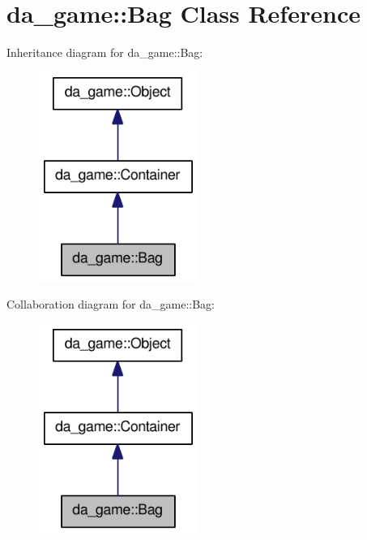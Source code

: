 \hypertarget{classda__game_1_1Bag}{
\section{da\_\-game::Bag Class Reference}
\label{classda__game_1_1Bag}
}
Inheritance diagram for da\_\-game::Bag:\nopagebreak
\begin{figure}[H]
\begin{center}
\leavevmode
\includegraphics[width=146pt]{classda__game_1_1Bag__inherit__graph}
\end{center}
\end{figure}
Collaboration diagram for da\_\-game::Bag:\nopagebreak
\begin{figure}[H]
\begin{center}
\leavevmode
\includegraphics[width=146pt]{classda__game_1_1Bag__coll__graph}
\end{center}
\end{figure}
